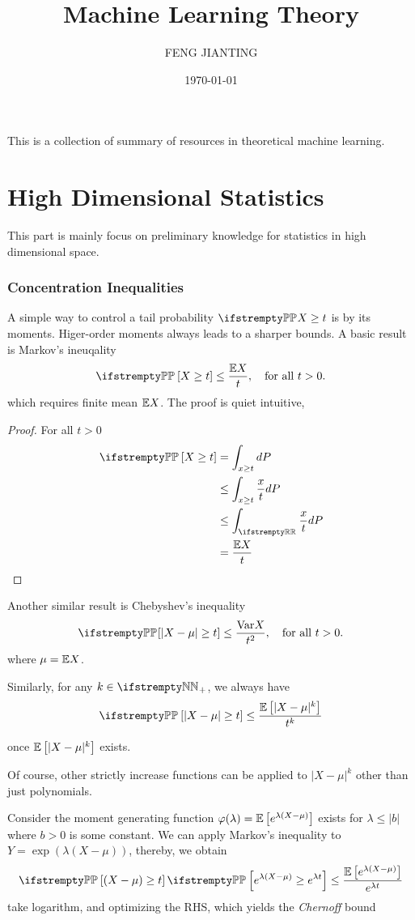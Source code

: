 \documentclass{paper}
\title{Machine Learning Theory}
\author{FENG JIANTING}
\date{\today}
\begin{document}
\maketitle
This is a collection of summary of resources in theoretical machine learning. ~\cite{NIPS2007_013a006f}
\tableofcontents
\part{High Dimensional Statistics}
This part is mainly focus on preliminary knowledge for statistics in high dimensional space.
\section{Concentration Inequalities}
A simple way to control a tail probability $\PP{X}\geq t$ is by its moments. Higer-order moments always leads to a sharper bounds. A basic result is Markov's ineuqality
\[
	\PP \left[X\geq t\right] \leq \frac{\EE X}{t}, \quad \text{for all } t > 0.
\]
which requires finite mean $\mathbb{E}{X}$. The proof is quiet intuitive,
\begin{proof}
	For all $t > 0$
	\begin{align}
		\PP\left[X\geq t\right] & = \int_{x\geq t} dP               \\
		                        & \leq \int_{x\geq t} \frac{x}{t}dP \\
		                        & \leq\int_{\RR}\frac{x}{t}dP       \\
		                        & = \frac{\EE X}{t}
	\end{align}
\end{proof}

Another similar result is Chebyshev's inequality
\[
	\PP{\left[\vert X-\mu\vert \geq t\right]} \leq \frac{\var{X}}{t^2}, \quad \text{for all } t > 0.
\]
where $\mu=\mathbb{E} X$.

Similarly, for any $k\in \NN_+$, we always have
\[
	\PP\left[\vert X-\mu\vert\geq t\right] \leq \frac{\EE\left[\vert X-\mu\vert^k\right]}{t^k}
\]

once $\mathbb{E}\left[\vert X-\mu\vert^k\right]$ exists.

Of course, other strictly increase functions can be applied to $\vert X-\mu\vert ^k$ other than just polynomials.
\par
Consider the moment generating function $\varphi(\lambda) = \mathbb{E} \left[e^{\lambda(X-\mu)}\right]$ exists for $\lambda \leq \vert b\vert$ where $b>0$ is some constant.
We can apply Markov's inequality to $Y = \exp(\lambda (X-\mu))$, thereby, we obtain
\[
	\PP\left[(X-\mu)\geq t\right] \PP\left[e^{\lambda(X-\mu)}\geq e^{\lambda t}\right] \leq \frac{\EE\left[e^{\lambda(X-\mu)}\right]}{e^{\lambda t}}
\]
take logarithm, and optimizing the RHS, which yields the \textit{Chernoff} bound
\end{document}
